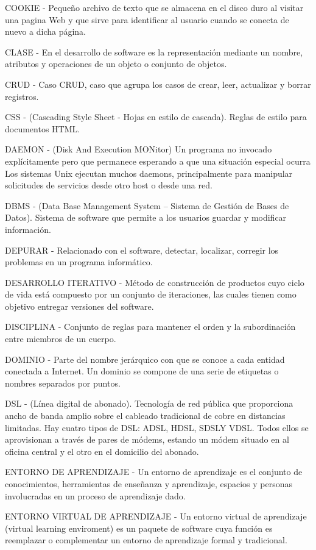 COOKIE -  Pequeño archivo de texto que se almacena en el disco duro al visitar una pagina Web y que sirve para identificar al usuario cuando se conecta de nuevo a dicha página.

CLASE -  En el desarrollo de software es la representación mediante un nombre, atributos y operaciones de un objeto o conjunto de objetos.

CRUD - Caso CRUD, caso que agrupa los casos de crear, leer, actualizar y borrar registros.

CSS -  (Cascading Style Sheet - Hojas en estilo de cascada). Reglas de estilo para documentos HTML.

DAEMON - (Disk And Execution MONitor) Un programa no invocado explícitamente pero que permanece esperando a que una situación especial ocurra  Los sistemas Unix ejecutan muchos daemons, principalmente para manipular solicitudes de servicios desde otro host o desde una red.

DBMS -  (Data Base Management System – Sistema de Gestión de Bases de Datos). Sistema de software que permite a los usuarios guardar y modificar información.

DEPURAR -  Relacionado con el software, detectar, localizar, corregir los problemas en un programa informático.

DESARROLLO ITERATIVO - Método de construcción de productos cuyo ciclo de vida está compuesto por un conjunto de iteraciones, las cuales tienen como objetivo entregar versiones del software.

DISCIPLINA - Conjunto de reglas para mantener el orden y la subordinación entre miembros de un cuerpo.

DOMINIO - Parte del nombre jerárquico con que se conoce a cada entidad conectada a Internet. Un dominio se compone de una serie de etiquetas o nombres separados por puntos.

DSL -  (Línea digital de abonado). Tecnología de red pública que proporciona ancho de banda amplio sobre el cableado tradicional de cobre en distancias limitadas. Hay cuatro tipos de DSL: ADSL, HDSL, SDSLY VDSL. Todos ellos se aprovisionan a través de pares de módems, estando un módem situado en al oficina central y el otro en el domicilio del abonado.

ENTORNO DE APRENDIZAJE - Un entorno de aprendizaje es el conjunto de conocimientos, herramientas de enseñanza y aprendizaje, espacios y personas involucradas en un proceso de aprendizaje dado.

ENTORNO VIRTUAL DE APRENDIZAJE - Un entorno virtual de aprendizaje (virtual learning enviroment) es un paquete de software cuya función es reemplazar o complementar un entorno de aprendizaje formal y tradicional.

